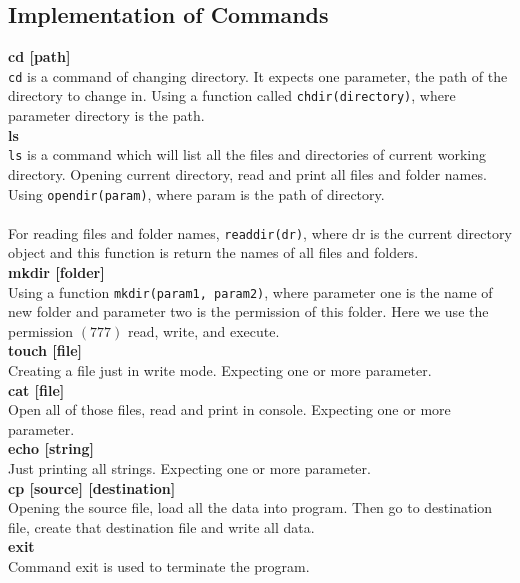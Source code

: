 \documentclass[12pt]{article}
\begin{document}
    \subsection{Implementation of Commands}
    \vspace{5mm}
    \textbf{cd [path]}\\
    \verb|cd| is a command of changing directory. It expects one parameter, the path of the directory to change in. Using a function called \verb|chdir(directory)|, where parameter directory is the path.
    \vspace{5mm}\\
    \textbf{ls}\\
    \verb|ls| is a command which will list all the files and directories of current working directory.
    Opening current directory, read and print all files and folder names. Using \verb|opendir(param)|, where  param is the path of directory.\\ \\
    For reading files and folder names,  \verb|readdir(dr)|, where dr is the current directory object and this function is return the names of all files and folders.
     \vspace{5mm}\\
    \textbf{mkdir [folder]}\\
    Using a function \verb|mkdir(param1, param2)|, where parameter one is the name of new folder and parameter two is the permission of this folder. Here we use the permission $(777)$ read, write, and execute.
     \vspace{5mm}\\
    \textbf{touch [file]}\\
    Creating a file just in write mode. Expecting one or more parameter.
    \vspace{5mm}\\
    \textbf{cat [file]}\\
    Open all of those files, read and print in console. Expecting one or more parameter.
    \vspace{5mm}\\
    \textbf{echo [string]}\\
    Just printing all strings. Expecting one or more parameter.
    \vspace{5mm}\\
    \textbf{cp [source] [destination]}\\
    Opening the source file, load all the data into program. Then go to destination file, create that destination file and write all data.
    \vspace{5mm}\\
    \textbf{exit}\\
    Command exit is used to terminate the program.
\end{document}
